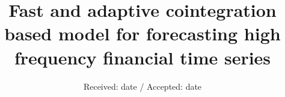 \documentclass{svjour3}                     %
\begin{document}
\title{Fast and adaptive cointegration based model
for forecasting high frequency financial time series}


\author{}


\date{Received: date / Accepted: date}


\maketitle
\end{document}
